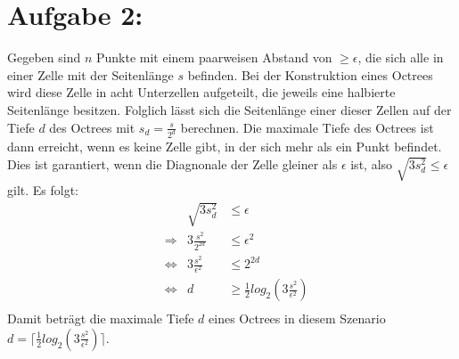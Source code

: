 \section*{Aufgabe 2: }
Gegeben sind $n$ Punkte mit einem paarweisen Abstand von $\geq \epsilon$, die sich alle in einer Zelle mit der Seitenlänge $s$ befinden. Bei der Konstruktion eines Octrees wird diese Zelle in acht Unterzellen aufgeteilt, die jeweils eine halbierte Seitenlänge besitzen. Folglich lässt sich die Seitenlänge einer dieser Zellen auf der Tiefe $d$ des Octrees mit $s_d = \frac{s}{2^d}$ berechnen. Die maximale Tiefe des Octrees ist dann erreicht, wenn es keine Zelle gibt, in der sich mehr als ein Punkt befindet. Dies ist garantiert, wenn die Diagnonale der Zelle gleiner als $\epsilon$ ist, also $\sqrt{3 s_d^2} \leq \epsilon$ gilt. Es folgt:
\begin{align*}
  && \sqrt{3 s_d^2} & \leq \epsilon\\
  &\Rightarrow & 3\frac{s^2}{2^{2d}} & \leq \epsilon^2\\
  &\Leftrightarrow & 3\frac{s^2}{\epsilon^2} & \leq 2^{2d}\\
  &\Leftrightarrow & d & \geq \frac{1}{2}log_2(3\frac{s^2}{\epsilon^2})\\
\end{align*}
Damit beträgt die maximale Tiefe $d$ eines Octrees in diesem Szenario $d = \lceil \frac{1}{2}log_2(3\frac{s^2}{\epsilon^2}) \rceil$.